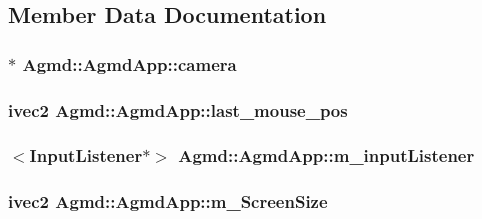 \subsection{Member Data Documentation}
\hypertarget{class_agmd_1_1_agmd_app_ac44a53c44d45dfec3e73331bb80cc08e}{
\subsubsection[{camera}]{ $\ast$ Agmd\+::\+Agmd\+App\+::camera\hspace{0.3cm}{\ttfamily [protected]}}}\label{class_agmd_1_1_agmd_app_ac44a53c44d45dfec3e73331bb80cc08e}
\hypertarget{class_agmd_1_1_agmd_app_a3c65fe03cc4c00b7e3f80c913fde9d15}{
\subsubsection[{last\+\_\+mouse\+\_\+pos}]{\setlength{\rightskip}{0pt plus 5cm}ivec2 Agmd\+::\+Agmd\+App\+::last\+\_\+mouse\+\_\+pos\hspace{0.3cm}{\ttfamily [protected]}}}\label{class_agmd_1_1_agmd_app_a3c65fe03cc4c00b7e3f80c913fde9d15}
\hypertarget{class_agmd_1_1_agmd_app_a28037d91849eced08f630408c9ce1e55}{
\subsubsection[{m\+\_\+input\+Listener}]{$<${\bf Input\+Listener}$\ast$$>$ Agmd\+::\+Agmd\+App\+::m\+\_\+input\+Listener\hspace{0.3cm}{\ttfamily [protected]}}}\label{class_agmd_1_1_agmd_app_a28037d91849eced08f630408c9ce1e55}
\hypertarget{class_agmd_1_1_agmd_app_acc122b7ae41e81cabf3e1dfcea5c8ec5}{
\subsubsection[{m\+\_\+\+Screen\+Size}]{\setlength{\rightskip}{0pt plus 5cm}ivec2 Agmd\+::\+Agmd\+App\+::m\+\_\+\+Screen\+Size\hspace{0.3cm}{\ttfamily [protected]}}}\label{class_agmd_1_1_agmd_app_acc122b7ae41e81cabf3e1dfcea5c8ec5}
